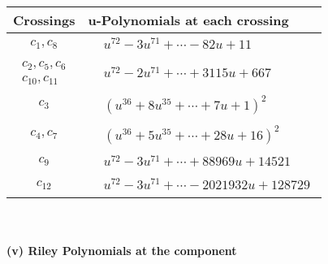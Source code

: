 \documentclass[1p]{elsarticle_modified}
\theoremstyle{definition}
\begin{document}
\begin{tabular}{m{50pt}|m{274pt}}
Crossings & \hspace{64pt}u-Polynomials at each crossing \\
\hline $$\begin{aligned}c_{1},c_{8}\end{aligned}$$&$\begin{aligned}
&u^{72}-3 u^{71}+\cdots-82 u+11
\end{aligned}$\\
\hline $$\begin{aligned}c_{2},c_{5},c_{6}\\c_{10},c_{11}\end{aligned}$$&$\begin{aligned}
&u^{72}-2 u^{71}+\cdots+3115 u+667
\end{aligned}$\\
\hline $$\begin{aligned}c_{3}\end{aligned}$$&$\begin{aligned}
&(u^{36}+8 u^{35}+\cdots+7 u+1)^{2}
\end{aligned}$\\
\hline $$\begin{aligned}c_{4},c_{7}\end{aligned}$$&$\begin{aligned}
&(u^{36}+5 u^{35}+\cdots+28 u+16)^{2}
\end{aligned}$\\
\hline $$\begin{aligned}c_{9}\end{aligned}$$&$\begin{aligned}
&u^{72}-3 u^{71}+\cdots+88969 u+14521
\end{aligned}$\\
\hline $$\begin{aligned}c_{12}\end{aligned}$$&$\begin{aligned}
&u^{72}-3 u^{71}+\cdots-2021932 u+128729
\end{aligned}$\\
\hline
\end{tabular}\\~\\
\newpage\renewcommand{\arraystretch}{1}
\flushleft \textbf{(v) Riley Polynomials at the component}\newline \\
\end{document}

